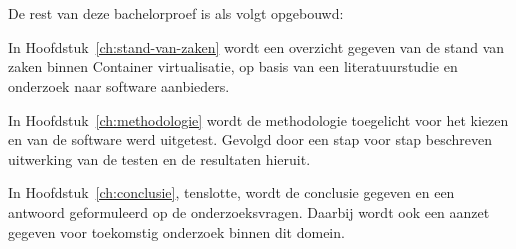 \section{}
\label{sec:opzet-bachelorproef}


De rest van deze bachelorproef is als volgt opgebouwd:

In Hoofdstuk~\ref{ch:stand-van-zaken} wordt een overzicht gegeven van de stand van zaken binnen Container virtualisatie, op basis van een literatuurstudie en onderzoek naar software aanbieders.

In Hoofdstuk~\ref{ch:methodologie} wordt de methodologie toegelicht voor het kiezen en van de software werd uitgetest. Gevolgd door een stap voor stap beschreven uitwerking van de testen en de resultaten hieruit. 

In Hoofdstuk~\ref{ch:conclusie}, tenslotte, wordt de conclusie gegeven en een antwoord geformuleerd op de onderzoeksvragen. Daarbij wordt ook een aanzet gegeven voor toekomstig onderzoek binnen dit domein.